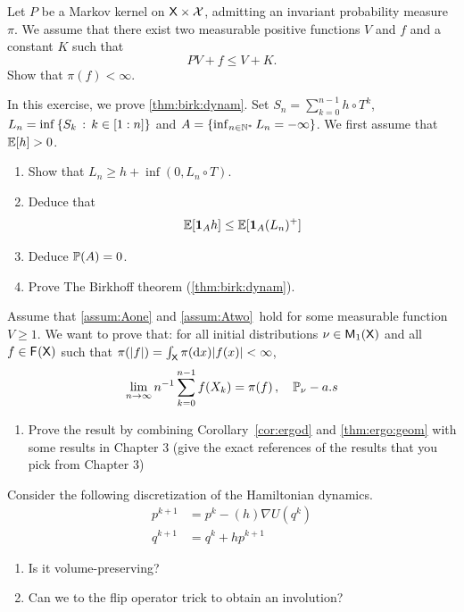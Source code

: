 \documentclass[english,graybox,envcountchap,envcountsame,sectrefs,shortlabels]{svmono}
\theoremstyle{style}
\begin{document}
\begin{exercise}
Let $P$ be a Markov kernel on $\mathsf{X}\times\mathcal{X}$, admitting an
invariant probability measure $\pi$. We assume that there exist two
measurable positive functions $V$ and $f$ and a constant $K$ such
that
\[
PV+f\leq V+K. 
\]
Show that $\pi(f)<\infty$.
\end{exercise}

\begin{exercise} \label{exo:birk}
In this exercise, we prove \autoref{thm:birk:dynam}.
Set $S_n=\sum_{k=0}^{n-1}h\circ T^{k}$, $L_n=\inf\left\{ S_k\,:\,k\in[1:n]\right\}$ and $A=\left\{ \inf_{n\in\mathbb{N}^*}L_n=-\infty\right\}$.
We first assume that $\mathbb{E}[h]>0$.
\begin{enumerate}
\item Show that $L_n \geq h+\inf(0,L_n\circ T)$.
\item Deduce that
$$
\mathbb{E}[\mathbf{1}_{A} h] \leq \mathbb{E}[\mathbf{1}_{A} (L_n)^+]
$$
\item Deduce $\mathbb{P}(A)=0$.
\item Prove The Birkhoff theorem (\autoref{thm:birk:dynam}).
\end{enumerate}
\end{exercise}

%
\begin{exercise}\label{exo:LLN:Aone:Atwo}
Assume that \ref{assum:Aone} and \ref{assum:Atwo}\ hold for some measurable function $V\geq 1$. We want to prove that: for all initial
distributions $\nu\in\mathsf{M}_{1}(\mathsf{X})$ and all $f\in\mathsf{F_{}}(\mathsf{X})$
such that $\pi(|f|)=\int_{\mathsf{X}}\pi(\mathrm{d} x)|f(x)|<\infty$,
\begin{equation}
\lim_{n\to\infty}n^{-1}\sum_{k=0}^{n-1}f(X_{k})=\pi(f)\,,\quad\mathbb{P}_{\nu}-a.s\label{eq:LLN:gener}
\end{equation}
\begin{enumerate}
\item Prove the result by combining Corollary~\ref{cor:ergod} and \autoref{thm:ergo:geom} with some results in Chapter 3 (give the exact references of the results that you pick from Chapter 3)
\end{enumerate}
\end{exercise}

\begin{exercise} \label{exo:discretiz:Hamilton}
Consider the following discretization of the Hamiltonian dynamics.
\begin{align}
p^{k+1}&=p^k-(h) \nabla U(q^k) \nonumber\\
q^{k+1}&=q^k+h p^{k+1} \label{eq:leap:update}
\end{align}
\begin{enumerate}
\item Is it volume-preserving?
\item Can we to the flip operator trick to obtain an involution?
\end{enumerate}
\end{exercise}





\printindex
\end{document}
